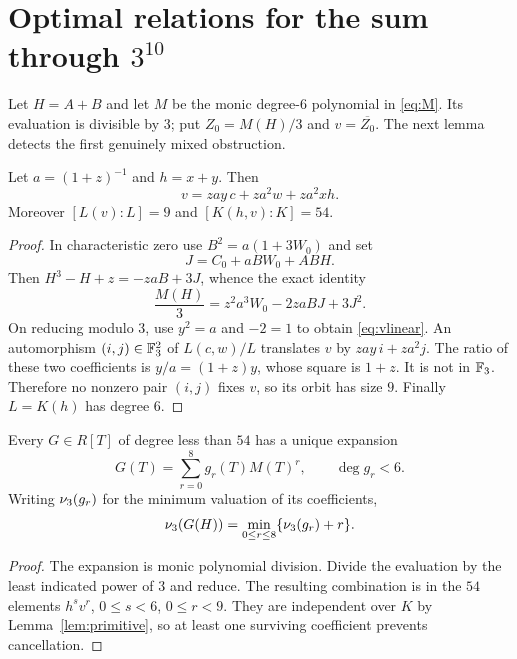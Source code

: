 \section{Optimal relations for the sum through \texorpdfstring{$3^{10}$}{3 to the tenth power}}
\label{sec:sum}

Let $H=A+B$ and let $M$ be the monic degree-$6$ polynomial
in \eqref{eq:M}. Its evaluation is divisible by $3$; put
$Z_0=M(H)/3$ and $v=\overline{Z_0}$. The next lemma detects the
first genuinely mixed obstruction.

\begin{lemma}\label{lem:primitive}
Let $a=(1+z)^{-1}$ and $h=x+y$. Then
\begin{equation}\label{eq:vlinear}
 v=zay\,c+za^2w+za^2xh.
\end{equation}
Moreover $[L(v):L]=9$ and $[K(h,v):K]=54$.
\end{lemma}
\begin{proof}
In characteristic zero use $B^2=a(1+3W_0)$ and set
\[
 J=C_0+aBW_0+ABH.
\]
Then $H^3-H+z=-zaB+3J$, whence the exact identity
\[
 \frac{M(H)}3=z^2a^3W_0-2zaBJ+3J^2.
\]
On reducing modulo $3$, use $y^2=a$ and $-2=1$ to obtain
\eqref{eq:vlinear}. An automorphism $(i,j)\in\mathbb F_3^2$ of
$L(c,w)/L$ translates $v$ by $zay\,i+za^2j$.
The ratio of these two coefficients is $y/a=(1+z)y$, whose square
is $1+z$. It is not in $\mathbb F_3$. Therefore no nonzero pair $(i,j)$
fixes $v$, so its orbit has size $9$. Finally $L=K(h)$ has degree $6$.
\end{proof}

\begin{proposition}\label{prop:sumval}
Every $G\in R[T]$ of degree less than $54$ has a unique expansion
\[
 G(T)=\sum_{r=0}^{8} g_r(T)M(T)^r,\qquad\deg g_r<6.
\]
Writing $\nu_3(g_r)$ for the minimum valuation of its coefficients,
\begin{equation}\label{eq:sumval}
 \nu_3(G(H))=\min_{0\le r\le8}\{\nu_3(g_r)+r\}.
\end{equation}
\end{proposition}
\begin{proof}
The expansion is monic polynomial division. Divide the evaluation by
the least indicated power of $3$ and reduce. The resulting combination
is in the $54$ elements $h^sv^r$, $0\le s<6$, $0\le r<9$.
They are independent over $K$ by Lemma~\ref{lem:primitive}, so at
least one surviving coefficient prevents cancellation.
\end{proof}

